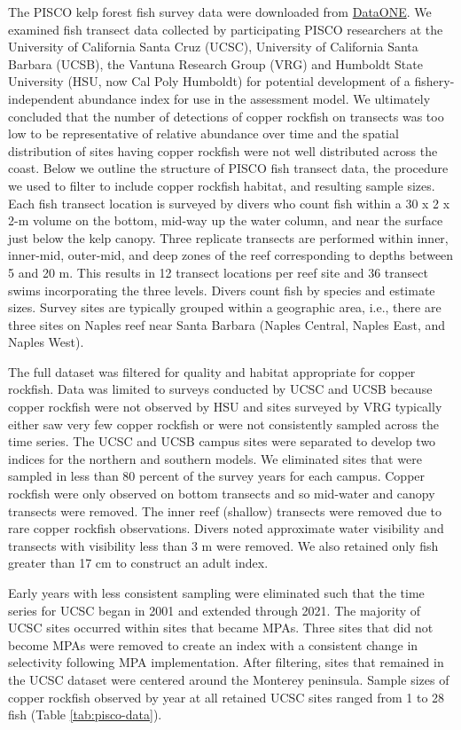 \documentclass[11pt,
  english,
  letterpaper,
]{article}
\begin{document}
The PISCO kelp forest fish survey data were downloaded from \href{https://www.dataone.org/}{DataONE}. We examined fish transect data collected by participating PISCO researchers at the University of California Santa Cruz (UCSC), University of California Santa Barbara (UCSB), the Vantuna Research Group (VRG) and Humboldt State University (HSU, now Cal Poly Humboldt) for potential development of a fishery-independent abundance index for use in the assessment model. We ultimately concluded that the number of detections of copper rockfish on transects was too low to be representative of relative abundance over time and the spatial distribution of sites having copper rockfish were not well distributed across the coast. Below we outline the structure of PISCO fish transect data, the procedure we used to filter to include copper rockfish habitat, and resulting sample sizes. Each fish transect location is surveyed by divers who count fish within a 30 x 2 x 2-m volume on the bottom, mid-way up the water column, and near the surface just below the kelp canopy. Three replicate transects are performed within inner, inner-mid, outer-mid, and deep zones of the reef corresponding to depths between 5 and 20 m. This results in 12 transect locations per reef site and 36 transect swims incorporating the three levels. Divers count fish by species and estimate sizes. Survey sites are typically grouped within a geographic area, i.e., there are three sites on Naples reef near Santa Barbara (Naples Central, Naples East, and Naples West).

The full dataset was filtered for quality and habitat appropriate for copper rockfish. Data was limited to surveys conducted by UCSC and UCSB because copper rockfish were not observed by HSU and sites surveyed by VRG typically either saw very few copper rockfish or were not consistently sampled across the time series. The UCSC and UCSB campus sites were separated to develop two indices for the northern and southern models. We eliminated sites that were sampled in less than 80 percent of the survey years for each campus. Copper rockfish were only observed on bottom transects and so mid-water and canopy transects were removed. The inner reef (shallow) transects were removed due to rare copper rockfish observations. Divers noted approximate water visibility and transects with visibility less than 3 m were removed. We also retained only fish greater than 17 cm to construct an adult index.

Early years with less consistent sampling were eliminated such that the time series for UCSC began in 2001 and extended through 2021. The majority of UCSC sites occurred within sites that became MPAs. Three sites that did not become MPAs were removed to create an index with a consistent change in selectivity following MPA implementation. After filtering, sites that remained in the UCSC dataset were centered around the Monterey peninsula. Sample sizes of copper rockfish observed by year at all retained UCSC sites ranged from 1 to 28 fish (Table \ref{tab:pisco-data}).
\end{document}
